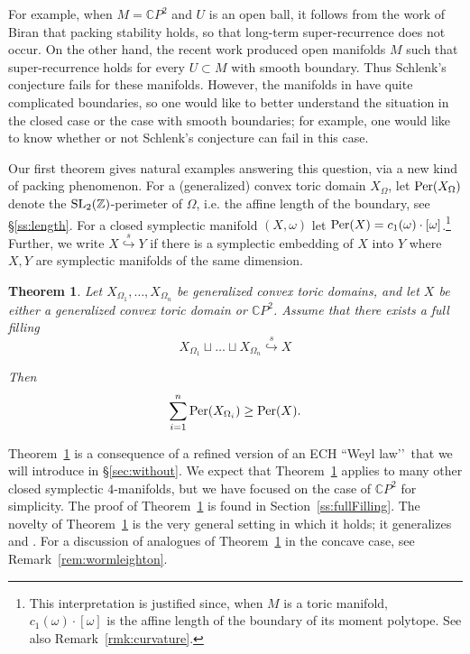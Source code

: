 \documentclass[11pt, reqno]{amsart}
\newtheorem{thm}{Theorem}[subsection]
\theoremstyle{remark}
\numberwithin{equation}{subsection}
\numberwithin{figure}{section}
\theoremstyle{customremark}
\newcommand{\se}{{\stackrel{s}\hookrightarrow}}
\newcommand{\Per}{{\rm Per}}
\newcommand{\SL}{{\rm SL}}
\begin{document}
For example, when $M = \mathbb{C}P^2$ and $U$ is an open ball, it follows from the 
work of Biran \cite{biran} that packing stability holds, 
so that  long-term super-recurrence does not occur.  On the other hand, the recent work \cite{cghind} produced open manifolds $M$ such that super-recurrence holds for every $U \subset M$ with smooth boundary. Thus Schlenk's conjecture fails for these manifolds.  However, the manifolds in \cite{cghind} have quite complicated boundaries, so one would like to better understand the situation in the closed case or the case with smooth boundaries; for example, one would like to know whether or not Schlenk's conjecture can fail in this case.


Our first theorem gives natural examples answering this question, via a new kind of packing phenomenon.  For a (generalized) convex toric domain $X_{\Omega}$, let $\Per(X_{\Omega})$ denote the $\SL_2(\mathbb{Z})$-perimeter of $\Omega$, i.e. the affine length of the boundary, see \S\ref{ss:length}.  For a closed symplectic manifold $(X,\omega)$ let $\Per(X) = c_1(\omega) \cdot [\omega]$.\footnote
{This interpretation is justified since, when $M$ is a toric manifold, $c_1(\omega) \cdot [\omega]$ is the affine length of the boundary of its moment polytope. See also Remark~\ref{rmk:curvature}.} Further, we write $X\se Y$ if there is a symplectic embedding of $X$ into $Y$ where $X,Y$ are symplectic manifolds of the same dimension.


\begin{thm}
\label{thm:packing} Let
$X_{\Omega_1}, \ldots, X_{\Omega_n}$ be generalized convex toric domains, and let $X$ be either a generalized convex toric domain or $\mathbb{C}P^2$.  Assume that there exists a full filling 
\[ X_{\Omega_1} \sqcup \ldots \sqcup X_{\Omega_n} \se X\]

Then
\[ \sum_{i=1}^n \Per(X_{\Omega_i}) \ge \Per(X).\]
\end{thm}

Theorem~\ref{thm:packing} is a consequence of a refined version of an ECH ``Weyl law\rq\rq\, that we will introduce in \S\ref{sec:without}.
We expect that Theorem~\ref{thm:packing} applies to many other closed symplectic $4$-manifolds, but we have focused on the case of $\mathbb{C}P^2$ for simplicity. The proof of Theorem~\ref{thm:packing} is found in Section~\ref{ss:fullFilling}.  The novelty of Theorem~\ref{thm:packing} is the very general setting in which it holds; it generalizes \cite[Cor. 1.13]{Ruel} and \cite[Cor. 2]{Wormleighton}.  For a discussion of analogues of Theorem~\ref{thm:packing} in the concave case, see Remark~\ref{rem:wormleighton}.
\end{document}
